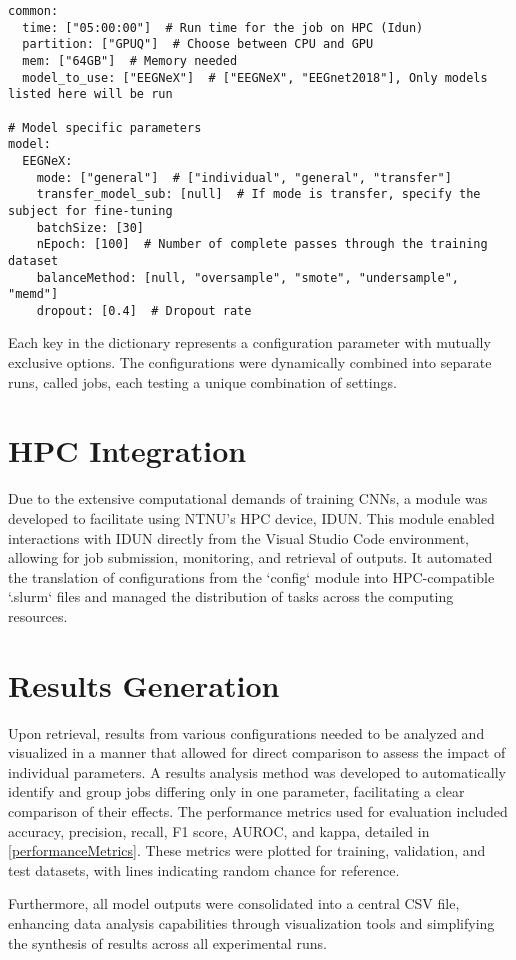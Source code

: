 \begin{footnotesize}
\begin{verbatim}
common:
  time: ["05:00:00"]  # Run time for the job on HPC (Idun)
  partition: ["GPUQ"]  # Choose between CPU and GPU
  mem: ["64GB"]  # Memory needed
  model_to_use: ["EEGNeX"]  # ["EEGNeX", "EEGnet2018"], Only models listed here will be run
  
# Model specific parameters
model:
  EEGNeX:
    mode: ["general"]  # ["individual", "general", "transfer"]
    transfer_model_sub: [null]  # If mode is transfer, specify the subject for fine-tuning
    batchSize: [30]
    nEpoch: [100]  # Number of complete passes through the training dataset
    balanceMethod: [null, "oversample", "smote", "undersample", "memd"]
    dropout: [0.4]  # Dropout rate
\end{verbatim}
\end{footnotesize}
Each key in the dictionary represents a configuration parameter with mutually exclusive options. The configurations were dynamically combined into separate runs, called jobs, each testing a unique combination of settings.

\section{HPC Integration}
\label{hpcIntegration}
Due to the extensive computational demands of training CNNs, a module was developed to facilitate using NTNU's HPC device, IDUN. This module enabled interactions with IDUN directly from the Visual Studio Code environment, allowing for job submission, monitoring, and retrieval of outputs. It automated the translation of configurations from the `config` module into HPC-compatible `.slurm` files and managed the distribution of tasks across the computing resources.

\section{Results Generation}
Upon retrieval, results from various configurations needed to be analyzed and visualized in a manner that allowed for direct comparison to assess the impact of individual parameters. A results analysis method was developed to automatically identify and group jobs differing only in one parameter, facilitating a clear comparison of their effects. The performance metrics used for evaluation included accuracy, precision, recall, F1 score, AUROC, and kappa, detailed in \autoref{performanceMetrics}. These metrics were plotted for training, validation, and test datasets, with lines indicating random chance for reference.

Furthermore, all model outputs were consolidated into a central CSV file, enhancing data analysis capabilities through visualization tools and simplifying the synthesis of results across all experimental runs.
 
